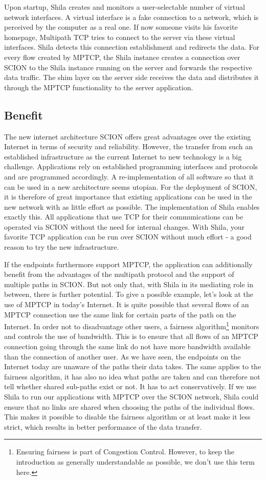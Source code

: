 Upon startup, Shila creates and monitors a user-selectable number of virtual network interfaces. A virtual interface is a fake connection to a network, which is perceived by the computer as a real one. If now someone visits his favorite homepage, Multipath TCP tries to connect to the server via these virtual interfaces. Shila detects this connection establishment and redirects the data.  For every flow created by MPTCP, the Shila instance creates a connection over SCION to the Shila instance running on the server and forwards the respective data traffic. The shim layer on the server side receives the data and distributes it through the MPTCP functionality to the server application.

\subsection*{Benefit}

The new internet architecture SCION offers great advantages over the existing Internet in terms of security and reliability. However, the transfer from such an established infrastructure as the current Internet to new technology is a big challenge. Applications rely on established programming interfaces and protocols and are programmed accordingly. A re-implementation of all software so that it can be used in a new architecture seems utopian. For the deployment of SCION, it is therefore of great importance that existing applications can be used in the new network with as little effort as possible. The implementation of Shila enables exactly this. All applications that use TCP for their communications can be operated via SCION without the need for internal changes. With Shila, your favorite TCP application can be run over SCION without much effort - a good reason to try the new infrastructure.

If the endpoints furthermore support MPTCP, the application can additionally benefit from the advantages of the multipath protocol and the support of multiple paths in SCION. But not only that, with Shila in its mediating role in between, there is further potential. To give a possible example, let's look at the use of MPTCP in today's Internet. It is quite possible that several flows of an MPTCP connection use the same link for certain parts of the path on the Internet. In order not to disadvantage other users, a fairness algorithm\footnote{Ensuring fairness is part of Congestion Control. However, to keep the introduction as generally understandable as possible, we don't use this term here.} monitors and controls the use of bandwidth. This is to ensure that all flows of an MPTCP connection going through the same link do not have more bandwidth available than the connection of another user. As we have seen, the endpoints on the Internet today are unaware of the paths their data takes. The same applies to the fairness algorithm, it has also no idea what paths are taken and can therefore not tell whether shared sub-paths exist or not. It has to act conservatively. If we use Shila to run our applications with MPTCP over the SCION network, Shila could ensure that no links are shared when choosing the paths of the individual flows. This makes it possible to disable the fairness algorithm or at least make it less strict, which results in better performance of the data transfer.
